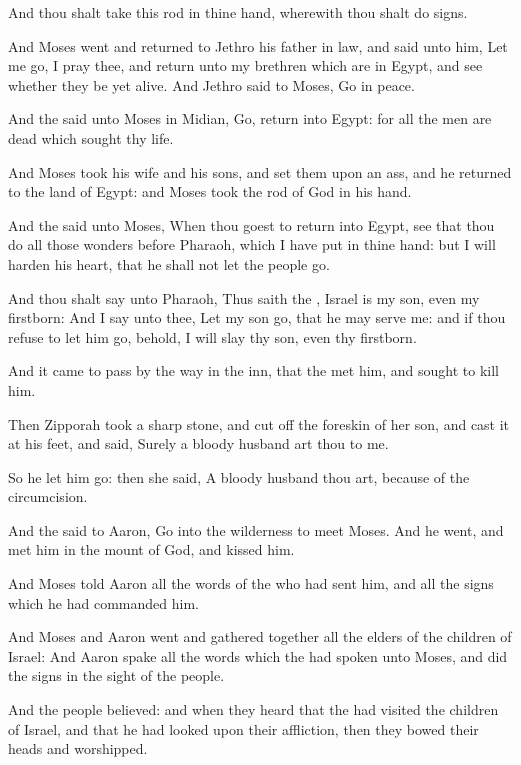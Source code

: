 \verse And thou shalt take this rod in thine hand, wherewith thou shalt do signs.

\verse And Moses went and returned to Jethro his father in law, and said unto him, Let me go, I pray thee, and return unto my brethren which are in Egypt, and see whether they be yet alive. And Jethro said to Moses, Go in peace.

\verse And the \LORD said unto Moses in Midian, Go, return into Egypt: for all the men are dead which sought thy life.

\verse And Moses took his wife and his sons, and set them upon an ass, and he returned to the land of Egypt: and Moses took the rod of God in his hand.

\verse And the \LORD said unto Moses, When thou goest to return into Egypt, see that thou do all those wonders before Pharaoh, which I have put in thine hand: but I will harden his heart, that he shall not let the people go.

\verse And thou shalt say unto Pharaoh, Thus saith the \LORD, Israel is my son, even my firstborn: \verse And I say unto thee, Let my son go, that he may serve me: and if thou refuse to let him go, behold, I will slay thy son, even thy firstborn.

\verse And it came to pass by the way in the inn, that the \LORD met him, and sought to kill him.

\verse Then Zipporah took a sharp stone, and cut off the foreskin of her son, and cast it at his feet, and said, Surely a bloody husband art thou to me.

\verse So he let him go: then she said, A bloody husband thou art, because of the circumcision.

\verse And the \LORD said to Aaron, Go into the wilderness to meet Moses.  And he went, and met him in the mount of God, and kissed him.

\verse And Moses told Aaron all the words of the \LORD who had sent him, and all the signs which he had commanded him.

\verse And Moses and Aaron went and gathered together all the elders of the children of Israel: \verse And Aaron spake all the words which the \LORD had spoken unto Moses, and did the signs in the sight of the people.

\verse And the people believed: and when they heard that the \LORD had visited the children of Israel, and that he had looked upon their affliction, then they bowed their heads and worshipped.

